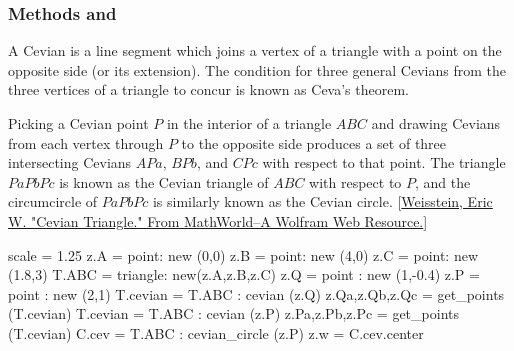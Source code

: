 
\subsubsection{Methods  and } %
\label{ssub:method_imeth_triangle_cevian}

A Cevian is a line segment which joins a vertex of a triangle with a point on the opposite side (or its extension). The condition for three general Cevians from the three vertices of a triangle to concur is known as Ceva's theorem.

Picking a Cevian point $P$ in the interior of a triangle $ABC$ and drawing Cevians from each vertex through $P$ to the opposite side produces a set of three intersecting Cevians $APa$, $BPb$, and $CPc$ with respect to that point. The triangle $PaPbPc$ is known as the Cevian triangle of $ABC$ with respect to $P$, and the circumcircle of $PaPbPc$ is similarly known as the Cevian circle. [\href{https://mathworld.wolfram.com/CevianTriangle.html}{Weisstein, Eric W. "Cevian Triangle." From MathWorld--A Wolfram Web Resource.}]


\vspace{6pt}

\begin{tkzelements}
  scale = 1.25
 z.A            = point: new (0,0)
 z.B            = point: new (4,0)
 z.C            = point: new (1.8,3)
 T.ABC          = triangle: new(z.A,z.B,z.C)
 z.Q            = point : new (1,-0.4) 
 z.P            = point : new (2,1) 
 T.cevian       = T.ABC : cevian (z.Q)
 z.Qa,z.Qb,z.Qc = get_points (T.cevian)
 T.cevian       = T.ABC : cevian (z.P)
 z.Pa,z.Pb,z.Pc = get_points (T.cevian)
 C.cev          = T.ABC : cevian_circle (z.P)
 z.w            = C.cev.center
\end{tkzelements}
\begin{center}
\end{center}


